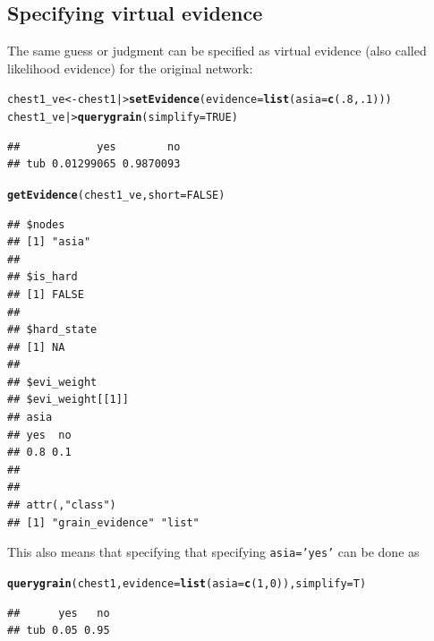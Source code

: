 \documentclass[10pt]{article}\usepackage[]{graphicx}\usepackage[]{xcolor}
\makeatletter
\newcommand{\hlnum}[1]{\textcolor[rgb]{0.686,0.059,0.569}{#1}}%
\newcommand{\hlstd}[1]{\textcolor[rgb]{0.345,0.345,0.345}{#1}}%
\newcommand{\hlkwb}[1]{\textcolor[rgb]{0.69,0.353,0.396}{#1}}%
\newcommand{\hlkwc}[1]{\textcolor[rgb]{0.333,0.667,0.333}{#1}}%
\newcommand{\hlkwd}[1]{\textcolor[rgb]{0.737,0.353,0.396}{\textbf{#1}}}%
\newenvironment{kframe}{%
 \def\at@end@of@kframe{}%
 \ifinner\ifhmode%
  \def\at@end@of@kframe{\end{minipage}}%
  \begin{minipage}{\columnwidth}%
 \fi\fi%
 \def\FrameCommand##1{\hskip\@totalleftmargin \hskip-\fboxsep
 \colorbox{shadecolor}{##1}\hskip-\fboxsep
     \hskip-\linewidth \hskip-\@totalleftmargin \hskip\columnwidth}%
 \MakeFramed {\advance\hsize-\width
   \@totalleftmargin\z@ \linewidth\hsize
   \@setminipage}}%
 {\par\unskip\endMakeFramed%
 \at@end@of@kframe}
\newenvironment{knitrout}{}{} %
\def\code#1{{\texttt{#1}}}
\makeatother
\begin{document}
\subsection{Specifying virtual evidence}
\label{sec:spec-virt-evid}

The same guess or judgment can be specified as virtual evidence
(also called likelihood evidence) for the original network:

\begin{knitrout}
\color{fgcolor}\begin{kframe}
\begin{alltt}
\hlstd{chest1_ve} \hlkwb{<-} \hlstd{chest1 |>} \hlkwd{setEvidence}\hlstd{(}\hlkwc{evidence}\hlstd{=}\hlkwd{list}\hlstd{(}\hlkwc{asia}\hlstd{=}\hlkwd{c}\hlstd{(}\hlnum{.8}\hlstd{,} \hlnum{.1}\hlstd{)))}
\hlstd{chest1_ve |>} \hlkwd{querygrain}\hlstd{(}\hlkwc{simplify} \hlstd{=} \hlnum{TRUE}\hlstd{)}
\end{alltt}
\begin{verbatim}
##            yes        no
## tub 0.01299065 0.9870093
\end{verbatim}
\begin{alltt}
\hlkwd{getEvidence}\hlstd{(chest1_ve,} \hlkwc{short}\hlstd{=}\hlnum{FALSE}\hlstd{)}
\end{alltt}
\begin{verbatim}
## $nodes
## [1] "asia"
## 
## $is_hard
## [1] FALSE
## 
## $hard_state
## [1] NA
## 
## $evi_weight
## $evi_weight[[1]]
## asia
## yes  no 
## 0.8 0.1 
## 
## 
## attr(,"class")
## [1] "grain_evidence" "list"
\end{verbatim}
\end{kframe}
\end{knitrout}

This also means that specifying that specifying \code{asia='yes'} can
be done as
\begin{knitrout}
\color{fgcolor}\begin{kframe}
\begin{alltt}
\hlkwd{querygrain}\hlstd{(chest1,} \hlkwc{evidence}\hlstd{=}\hlkwd{list}\hlstd{(}\hlkwc{asia}\hlstd{=}\hlkwd{c}\hlstd{(}\hlnum{1}\hlstd{,} \hlnum{0}\hlstd{)),} \hlkwc{simplify}\hlstd{=T)}
\end{alltt}
\begin{verbatim}
##      yes   no
## tub 0.05 0.95
\end{verbatim}
\end{kframe}
\end{knitrout}
\end{document}
